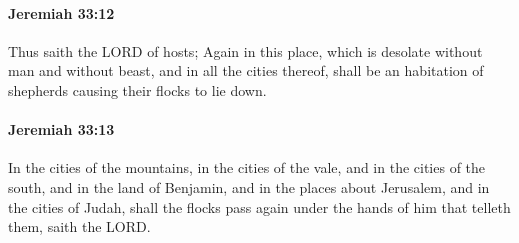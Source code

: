 		\paragraph{Jeremiah 33:12} %
			\label{JEREMIAH-33-12}

			Thus saith the LORD of hosts; Again in this place, which is desolate without man and without beast, and in all the cities thereof, shall be an habitation of shepherds causing their flocks to lie down.


		\paragraph{Jeremiah 33:13} %
			\label{JEREMIAH-33-13}

			In the cities of the mountains, in the cities of the vale, and in the cities of the south, and in the land of Benjamin, and in the places about Jerusalem, and in the cities of Judah, shall the flocks pass again under the hands of him that telleth them, saith the LORD.

